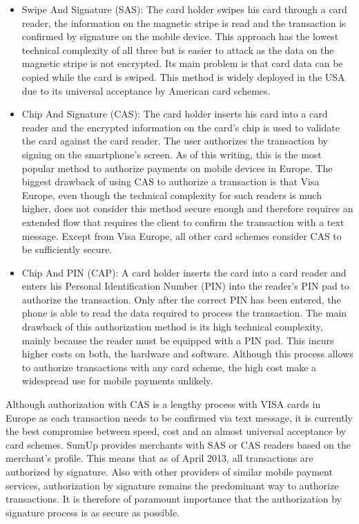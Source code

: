 \documentclass[a4paper, oneside]{csthesis}
\begin{document}
\begin{itemize}
\item Swipe And Signature (SAS): The card holder swipes his card through a card reader, the information on the magnetic stripe is read and the transaction is confirmed by signature on the mobile device. This approach has the lowest technical complexity of all three but is easier to attack as the data on the magnetic stripe is not encrypted. Its main problem is that card data can be copied while the card is swiped. This method is widely deployed in the USA due to its universal acceptance by American card schemes.

\item Chip And Signature (CAS): The card holder inserts his card into a card reader and the encrypted information on the card's chip is used to validate the card against the card reader. The user authorizes the transaction by signing on the smartphone's screen. As of this writing, this is the most popular method to authorize payments on mobile devices in Europe. The biggest drawback of using CAS to authorize a transaction is that Visa Europe, even though the technical complexity for such readers is much higher, does not consider this method secure enough and therefore requires an extended flow that requires the client to confirm the transaction with a text message. Except from Visa Europe, all other card schemes consider CAS to be sufficiently secure.

\item Chip And PIN (CAP): A card holder inserts the card into a card reader and enters his Personal Identification Number (PIN) into the reader's PIN pad to authorize the transaction. Only after the correct PIN has been entered, the phone is able to read  the data required to process the transaction. The main drawback of this authorization method is its high technical complexity, mainly because the reader must be equipped with a PIN pad. This incurs higher costs on both, the hardware and software. Although this process allows to authorize transactions with any card scheme, the high cost make a widespread use for mobile payments unlikely.
\end{itemize}

Although authorization with CAS is a lengthy process with VISA cards in Europe as each transaction needs to be confirmed via text message, it is currently the best compromise between speed, cost and an almost universal acceptance by card schemes. SumUp provides merchants with SAS or CAS readers based on the merchant's profile. This means that as of April 2013, all transactions are authorized by signature. Also with other providers of similar mobile payment services, authorization by signature remains the predominant way to authorize transactions. It is therefore of paramount importance that the authorization by signature process is as secure as possible.
\end{document}
